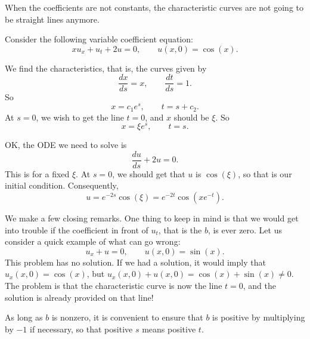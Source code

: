 \documentclass{ximera}
\begin{document}
When the coefficients are not constants, the characteristic curves are not going to be straight lines anymore.

\begin{example}
    Consider the following variable coefficient equation:
    \begin{equation*}
        x u_x + u_t + 2 u = 0, \qquad u(x,0) = \cos(x) . %
    \end{equation*}
\end{example}
\begin{exampleSol}
    We find the characteristics, that is, the curves given by
    \begin{equation*}
        \frac{dx}{ds} = x, \qquad \frac{dt}{ds} = 1 .
    \end{equation*}
    So
    \begin{equation*}
        x = c_1 e^{s} , \qquad t = s+ c_2 .
    \end{equation*}
    At $s=0$, we wish to get the line $t=0$, and $x$ should be $\xi$.  So
    \begin{equation*}
        x = \xi e^s, \qquad t = s .
    \end{equation*}
    
    OK\@, the ODE we need to solve is
    \begin{equation*}
        \frac{du}{ds} + 2 u = 0 .
    \end{equation*}
    This is for a fixed $\xi$.  At $s=0$, we should get that $u$ is $\cos(\xi)$, so that is our initial condition.  Consequently,
    \begin{equation*}
        u = e^{-2s} \cos(\xi)= e^{-2t} \cos(xe^{-t}) .
    \end{equation*}
\end{exampleSol}


We make a few closing remarks. One thing to keep in mind is that we would get into trouble if the coefficient in front of $u_t$, that is the $b$, is ever zero. Let us consider a quick example of what can go wrong:
\begin{equation*}
    u_x + u = 0, \qquad u(x,0) = \sin(x).
\end{equation*}
This problem has no solution.  If we had a solution, it would imply that $u_x(x,0) = \cos(x)$, but $u_x(x,0) + u(x,0) = \cos(x) + \sin(x) \not= 0$. The problem is that the characteristic curve is now the line $t=0$, and the solution is already provided on that line!

As long as $b$ is nonzero, it is convenient to ensure that $b$ is positive by multiplying by $-1$ if necessary, so that positive $s$ means positive $t$.
\end{document}
